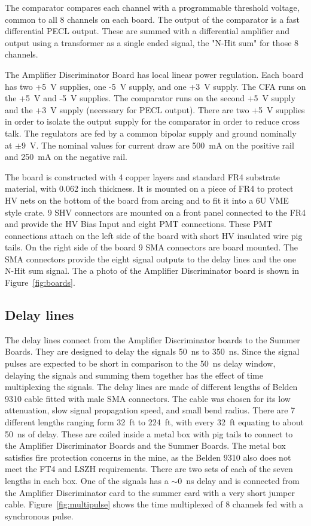 \documentclass{JINST}
\begin{document}
The comparator compares each channel with a programmable threshold
voltage, common to all 8 channels on each board.  The output of the
comparator is a fast differential PECL output.  These are summed with
a differential amplifier and output using a transformer as a single
ended signal, the "N-Hit sum" for those 8 channels.

The Amplifier Discriminator Board has local linear power regulation.
Each board has two +5~V supplies, one -5~V supply, and one +3~V supply.
The CFA runs on the +5~V and -5~V supplies.  The comparator runs on the
second +5~V supply and the +3~V supply (necessary for PECL output).
There are two +5~V supplies in order to isolate the output supply for
the comparator in order to reduce cross talk.  The regulators are fed
by a common bipolar supply and ground nominally at $\pm$9~V.  The
nominal values for current draw are 500~mA on the positive rail and
250~mA on the negative rail.

The board is constructed with 4 copper layers and standard FR4
substrate material, with 0.062 inch thickness.  It is mounted on a piece
of FR4 to protect HV nets on the bottom of the board from arcing and
to fit it into a 6U VME style crate.  9 SHV connectors are mounted on
a front panel connected to the FR4 and provide the HV Bias Input and
eight PMT connections.  These PMT connections attach on the left side
of the board with short HV insulated wire pig tails.  On the right
side of the board 9 SMA connectors are board mounted.  The SMA
connectors provide the eight signal outputs to the delay lines and the
one N-Hit sum signal.  The a photo of the Amplifier Discriminator
board is shown in Figure~\ref{fig:boards}.

\subsection{Delay lines}
\label{sec:Delay}
%
The delay lines connect from the Amplifier Discriminator boards to the
Summer Boards.  They are designed to delay the signals 50~ns to 350~ns.
Since the signal pulses are expected to be short in
comparison to the 50~ns delay window, delaying the signals and summing
them together has the effect of time multiplexing the signals.  The
delay lines are made of different lengths of Belden 9310 cable fitted
with male SMA connectors.  The cable was chosen for its low
attenuation, slow signal propagation speed, and small bend radius.
There are 7 different lengths ranging form 32~ft to 224~ft, with every 32~ft
equating to about 50~ns of delay.  These are coiled inside a metal box
with pig tails to connect to the Amplifier Discriminator Boards and
the Summer Boards.  The metal box satisfies fire protection concerns
in the mine, as the Belden 9310 also does not meet the FT4 and LSZH
requirements. There are two sets of each of the seven lengths in each box.
One of the signals has a $\sim$0~ns delay and is connected from the
Amplifier Discriminator card to the summer card with a very short
jumper cable.  Figure~\ref{fig:multipulse} shows the time multiplexed
of 8 channels fed with a synchronous pulse.
\end{document}

